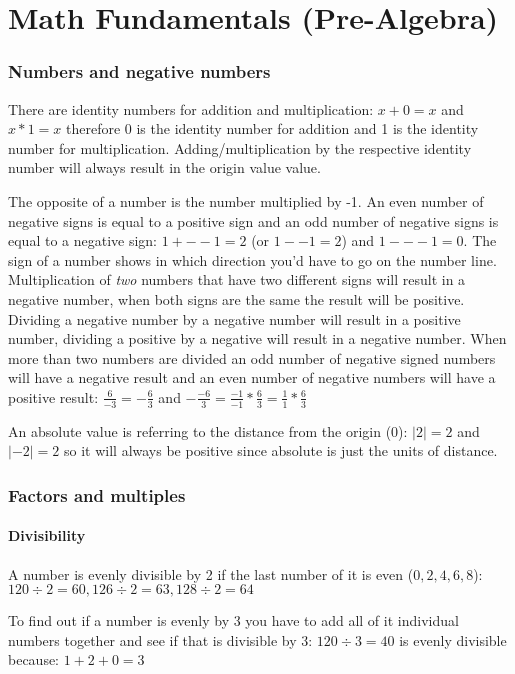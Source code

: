\documentclass{article}
\begin{document}
\part{Math Fundamentals (Pre-Algebra)}
\section{Numbers and negative numbers}

There are identity numbers for addition and  multiplication: $x+0=x$ and $x*1=x$ therefore 0 is the identity number for addition and 1 is the identity number for multiplication. Adding/multiplication by the respective identity number will always result in the origin value value.

The opposite of a number is the number multiplied by -1. An even number of negative signs is equal to a positive sign and an odd number of negative signs is equal to a negative sign: $1+--1=2$ (or $1--1=2$) and $1---1=0$. The sign of a number shows in which direction you'd have to go on the number line. Multiplication of \emph{two} numbers that have two different signs will result in a negative number, when both signs are the same the result will be positive.
Dividing a negative number by a negative number will result in a positive number, dividing a positive by a negative will result in a negative number. When more than two numbers are divided an odd number of negative signed numbers will have a negative result and an even number of negative numbers will have a positive result:
$\frac{6}{-3} = -\frac{6}{3}$ and $-\frac{-6}{3} = \frac{-1}{-1}*\frac{6}{3} = \frac{1}{1}*\frac{6}{3}$

An absolute value is referring to the distance from the origin (0): $ \left|2\right| = 2$ and $\left|-2\right| = 2$ so it will always be positive since absolute is just the units of distance.


\section{Factors and multiples}
\subsection{Divisibility}
A number is evenly divisible by 2 if the last number of it is even ($0,2,4,6,8$):
$120\div2 = 60, 126\div2=63, 128\div2=64$ 

To find out if a number is evenly by 3 you have to add all of it individual numbers together and see if that is divisible by 3: $120\div3=40$ is evenly divisible because: $1+2+0 = 3 $ 
\end{document}
